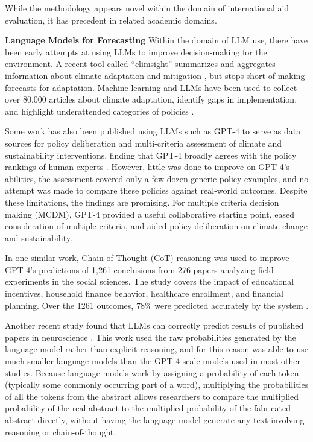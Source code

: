 \documentclass[12pt,a4paper]{article}
\let\citep\parencite
\begin{document}
While the methodology appears novel within the domain of international aid evaluation, it has precedent in related academic domains.

\textbf{Language Models for Forecasting} 
Within the domain of LLM use, there have been early attempts at using LLMs to improve decision-making for the environment. A recent tool called ``climsight'' summarizes and aggregates information about climate adaptation and mitigation \citep{koldunovLocalClimateServices2024}, but stops short of making forecasts for adaptation. Machine learning and LLMs have been used to collect over 80,000 articles about climate adaptation, identify gaps in implementation, and highlight underattended categories of policies \citep{callaghanMachineLearningMap2025a}.

Some work has also been published using LLMs such as GPT-4 to serve as data sources for policy deliberation and multi‑criteria assessment of climate and sustainability interventions, finding that GPT-4 broadly agrees with the policy rankings of human experts \citep{binaLargeLanguageModels2025}. However, little was done to improve on GPT-4's abilities, the assessment covered only a few dozen generic policy examples, and no attempt was made to compare these policies against real-world outcomes. Despite these limitations, the findings are promising. For multiple criteria decision making (MCDM), GPT-4 provided a useful collaborative starting point, eased consideration of multiple criteria, and aided policy deliberation on climate change and sustainability.

In one similar work, Chain of Thought (CoT) reasoning was used to improve GPT-4's predictions of 1,261 conclusions from 276 papers analyzing field experiments in the social sciences. The study covers the impact of educational incentives, household finance behavior, healthcare enrollment, and financial planning. Over the 1261 outcomes, 78\% were predicted accurately by the system \citep{chenPredictingFieldExperiments2025}.

Another recent study found that LLMs can correctly predict results of published papers in neuroscience \citep{luoLargeLanguageModels2025}. This work used the raw probabilities generated by the language model rather than explicit reasoning, and for this reason was able to use much smaller language models than the GPT-4-scale models used in most other studies. Because language models work by assigning a probability of each token (typically some commonly occurring part of a word), multiplying the probabilities of all the tokens from the abstract allows researchers to compare the multiplied probability of the real abstract to the multiplied probability of the fabricated abstract directly, without having the language model generate any text involving reasoning or chain-of-thought. 
\end{document}

